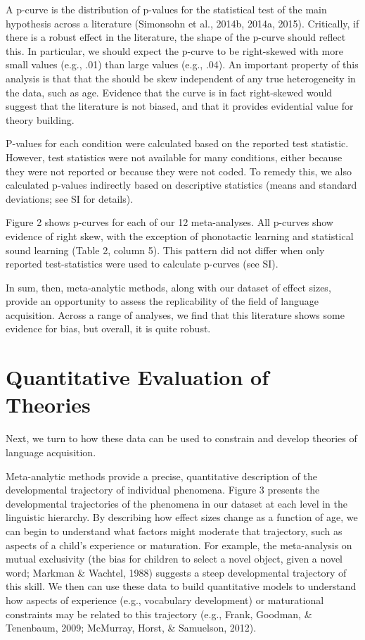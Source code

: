 \documentclass[english,floatsintext,man]{apa6}
\theoremstyle{definition}
\theoremstyle{definition}
\theoremstyle{remark}
\begin{document}
A p-curve is the distribution of p-values for the statistical test of
the main hypothesis across a literature (Simonsohn et al., 2014b, 2014a,
2015). Critically, if there is a robust effect in the literature, the
shape of the p-curve should reflect this. In particular, we should
expect the p-curve to be right-skewed with more small values (e.g., .01)
than large values (e.g., .04). An important property of this analysis is
that that the should be skew independent of any true heterogeneity in
the data, such as age. Evidence that the curve is in fact right-skewed
would suggest that the literature is not biased, and that it provides
evidential value for theory building.

P-values for each condition were calculated based on the reported test
statistic. However, test statistics were not available for many
conditions, either because they were not reported or because they were
not coded. To remedy this, we also calculated p-values indirectly based
on descriptive statistics (means and standard deviations; see SI for
details).

Figure 2 shows p-curves for each of our 12 meta-analyses. All p-curves
show evidence of right skew, with the exception of phonotactic learning
and statistical sound learning (Table 2, column 5). This pattern did not
differ when only reported test-statistics were used to calculate
p-curves (see SI).

In sum, then, meta-analytic methods, along with our dataset of effect
sizes, provide an opportunity to assess the replicability of the field
of language acquisition. Across a range of analyses, we find that this
literature shows some evidence for bias, but overall, it is quite
robust.

\section{Quantitative Evaluation of
Theories}\label{quantitative-evaluation-of-theories}

Next, we turn to how these data can be used to constrain and develop
theories of language acquisition.

Meta-analytic methods provide a precise, quantitative description of the
developmental trajectory of individual phenomena. Figure 3 presents the
developmental trajectories of the phenomena in our dataset at each level
in the linguistic hierarchy. By describing how effect sizes change as a
function of age, we can begin to understand what factors might moderate
that trajectory, such as aspects of a child's experience or maturation.
For example, the meta-analysis on mutual exclusivity (the bias for
children to select a novel object, given a novel word; Markman \&
Wachtel, 1988) suggests a steep developmental trajectory of this skill.
We then can use these data to build quantitative models to understand
how aspects of experience (e.g., vocabulary development) or maturational
constraints may be related to this trajectory (e.g., Frank, Goodman, \&
Tenenbaum, 2009; McMurray, Horst, \& Samuelson, 2012).
\end{document}
